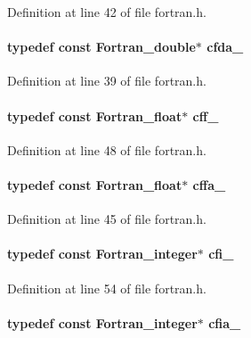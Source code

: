 Definition at line 42 of file fortran.h.

\paragraph[{cfda\_\-}]{\setlength{\rightskip}{0pt plus 5cm}typedef const {\bf Fortran\_\-double}$\ast$ {\bf cfda\_\-}}\hfill\label{fortran_8h_abafafa136f1f176b0b12d102b049afb8}


Definition at line 39 of file fortran.h.

\paragraph[{cff\_\-}]{\setlength{\rightskip}{0pt plus 5cm}typedef const {\bf Fortran\_\-float}$\ast$ {\bf cff\_\-}}\hfill\label{fortran_8h_a93165f45ea12ce959ec343a0d67c4a35}


Definition at line 48 of file fortran.h.

\paragraph[{cffa\_\-}]{\setlength{\rightskip}{0pt plus 5cm}typedef const {\bf Fortran\_\-float}$\ast$ {\bf cffa\_\-}}\hfill\label{fortran_8h_ab95eaa87acbfb1ced5f381d18fba7012}


Definition at line 45 of file fortran.h.

\paragraph[{cfi\_\-}]{\setlength{\rightskip}{0pt plus 5cm}typedef const {\bf Fortran\_\-integer}$\ast$ {\bf cfi\_\-}}\hfill\label{fortran_8h_ab3df84a792bbb23408a136cf4825aeb4}


Definition at line 54 of file fortran.h.

\paragraph[{cfia\_\-}]{\setlength{\rightskip}{0pt plus 5cm}typedef const {\bf Fortran\_\-integer}$\ast$ {\bf cfia\_\-}}\hfill\label{fortran_8h_a4b3ac5d91419543d1b7af1722330fe1b}


